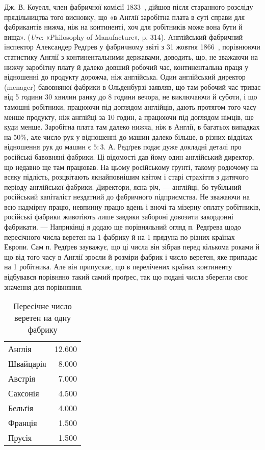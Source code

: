 Дж. В. Коуелл, член фабричної комісії 1833~, дійшов після
старанного розсліду прядільництва того висновку, що «в Англії
заробітна плата в суті справи для фабрикантів нижча, ніж на
континенті, хоч для робітників може вона бути й вища». (\emph{Ure}:
«Philosophy of Manufacture», p. 314). Англійський фабричний
інспектор Александер Редґрев у фабричному звіті з 31 жовтня
1866~, порівнюючи статистику Англії з континентальними державами,
доводить, що, не зважаючи на нижчу заробітну плату
й далеко довший робочий час, континентальна праця у відношенні
до продукту дорожча, ніж англійська. Один англійський
директор (menager) бавовняної фабрики в Ольденбурзі заявляв,
що там робочий час триває від 5 години 30 хвилин ранку до
8 години вечора, не виключаючи й суботи, і що тамошні робітники,
працюючи під доглядом англійців, дають протягом того часу
менше продукту, ніж англійці за 10 годин, а працюючи під
доглядом німців, ще куди менше. Заробітна плата там далеко
нижча, ніж в Англії, в багатьох випадках на 50\%, але число
рук у відношенні до машин далеко більше, в різних відділах
відношення рук до машин є $5: 3$. А. Редґрев подає дуже докладні
деталі про російські бавовняні фабрики. Ці відомості дав йому
один англійський директор, що недавно ще там працював. На
цьому російському ґрунті, такому родючому на всяку підлість,
розцвітають якнайповнішим квітом і старі страхіття з дитячого
періоду англійської фабрики. Директори, ясна річ, — англійці,
бо тубільний російський капіталіст нездатний до фабричного
підприємства. Не зважаючи на всю надмірну працю, невпинну
працю вдень і вночі та мізерну оплату робітників, російські фабрики
животіють лише завдяки забороні довозити закордонні фабрикати.
— Наприкінці я додаю ще порівняльний огляд п. Редґрева
щодо пересічного числа веретен на 1 фабрику й на 1 прядуна
по різних країнах Европи. Сам п. Редґрев зауважує, що ці
числа він зібрав перед кількома роками й що від того часу в Англії
зросли й розміри фабрик і число веретен, яке припадає на 1 робітника.
Але він припускає, що в перелічених країнах континенту
відбувався порівняно такий самий проґрес, так що подані
числа зберегли своє значення для порівняння.


\begin{table}[h]
    \centering
    \caption*{Пересічне число веретен на одну фабрику}
    \begin{tabularx}{0.5\textwidth}{Xr}
        Англія\dotfill{} & \num{12.600} \\
        Швайцарія\dotfill{} & \num{8.000} \\
        Австрія\dotfill{} & \num{7.000} \\
        Саксонія\dotfill{} & \num{4.500} \\
        Бельґія\dotfill{} & \num{4.000} \\
        Франція\dotfill{} & \num{1.500} \\
        Прусія\dotfill{} & \num{1.500} \\
    \end{tabularx}
\end{table}

